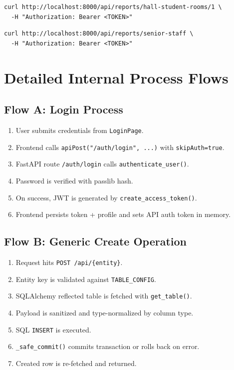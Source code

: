 \documentclass[11pt,a4paper]{article}
\begin{document}
\begin{lstlisting}[language={},caption={Report g: hall student rooms}]
curl http://localhost:8000/api/reports/hall-student-rooms/1 \
  -H "Authorization: Bearer <TOKEN>"
\end{lstlisting}

\begin{lstlisting}[language={},caption={Report n: senior staff}]
curl http://localhost:8000/api/reports/senior-staff \
  -H "Authorization: Bearer <TOKEN>"
\end{lstlisting}

\section{Detailed Internal Process Flows}
\subsection{Flow A: Login Process}
\begin{enumerate}
  \item User submits credentials from \texttt{LoginPage}.
  \item Frontend calls \texttt{apiPost("/auth/login", ...)} with \texttt{skipAuth=true}.
  \item FastAPI route \texttt{/auth/login} calls \texttt{authenticate\_user()}.
  \item Password is verified with passlib hash.
  \item On success, JWT is generated by \texttt{create\_access\_token()}.
  \item Frontend persists token + profile and sets API auth token in memory.
\end{enumerate}

\subsection{Flow B: Generic Create Operation}
\begin{enumerate}
  \item Request hits \texttt{POST /api/\{entity\}}.
  \item Entity key is validated against \texttt{TABLE\_CONFIG}.
  \item SQLAlchemy reflected table is fetched with \texttt{get\_table()}.
  \item Payload is sanitized and type-normalized by column type.
  \item SQL \texttt{INSERT} is executed.
  \item \texttt{\_safe\_commit()} commits transaction or rolls back on error.
  \item Created row is re-fetched and returned.
\end{enumerate}
\end{document}
